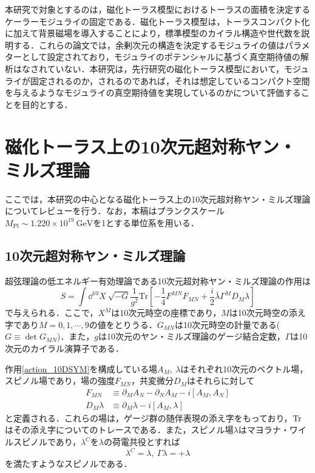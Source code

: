 \documentclass[a4paper,uplatex,dvipdfmx]{jsarticle}
\theoremstyle{definition}
\begin{document}
本研究で対象とするのは，磁化トーラス模型におけるトーラスの面積を決定するケーラーモジュライの固定である．磁化トーラス模型は，トーラスコンパクト化に加えて背景磁場を導入することにより，標準模型のカイラル構造や世代数を説明する\cite{Cremades_ComputingYukawa_2004a,Abe_SuperfieldDescription_2012,Abe_AhlerModuli_2017}．これらの論文では，余剰次元の構造を決定するモジュライの値はパラメターとして設定されており，モジュライのポテンシャルに基づく真空期待値の解析はなされていない．本研究は，先行研究の磁化トーラス模型において，モジュライが固定されるのか，されるのであれば，それは想定しているコンパクト空間を与えるようなモジュライの真空期待値を実現しているのかについて評価することを目的とする．


\section{磁化トーラス上の10次元超対称ヤン・ミルズ理論}

ここでは，本研究の中心となる磁化トーラス上の10次元超対称ヤン・ミルズ理論についてレビューを行う．なお，本稿はプランクスケール$M_{\text{Pl}}\sim 1.220\times 10^{19}\ \text{GeV}$を1とする単位系を用いる．


\subsection{10次元超対称ヤン・ミルズ理論}

超弦理論の低エネルギー有効理論である10次元超対称ヤン・ミルズ理論の作用は
\begin{equation}
   S
   =
   \int
   \dd^{10}X\ 
   \sqrt{-G}\frac{1}{g^2}
   \text{Tr}
   \left[  
      -
      \frac{1}{4}F^{MN}F_{MN}
      +
      \frac{i}{2}
      \bar{\lambda}\Gamma^{M}D_{M}\lambda
   \right]
   \label{action_10DSYM}
\end{equation}
で与えられる．ここで，$X^{M}$は10次元時空の座標であり，$M$は10次元時空の添え字であり$M=0,1,\cdots,9$の値をとりうる．$G_{MN}$は10次元時空の計量である($G\equiv\det G_{MN}$)．また，$g$は10次元のヤン・ミルズ理論のゲージ結合定数，$\Gamma$は10次元のカイラル演算子である．

作用\eqref{action_10DSYM}を構成している場$A_{M},\ \lambda$はそれぞれ10次元のベクトル場，スピノル場であり，場の強度$F_{MN}$，共変微分$D_{M}$はそれらに対して
\begin{align}
   F_{MN}
   &\equiv
   \partial_{M}A_{N}
   -
   \partial_{N}A_{M}
   -
   i[A_{M},A_{N}]
   \nonumber
   \\
   D_{M}\lambda
   &\equiv
   \partial_{M}\lambda
   -
   i[A_{M},\lambda]
   \nonumber
\end{align}
と定義される．これらの場は，ゲージ群の随伴表現の添え字をもっており，$\text{Tr\hspace{1pt}}$はその添え字についてのトレースである．また，スピノル場$\lambda$はマヨラナ・ワイルスピノルであり，$\lambda^{C}$を$\lambda$の荷電共役とすれば
\begin{equation}
   \lambda^{C}
   =
   \lambda
   ,\ 
   \Gamma\lambda
   =
   +\lambda
   \nonumber
\end{equation}
を満たすようなスピノルである．
\end{document}
